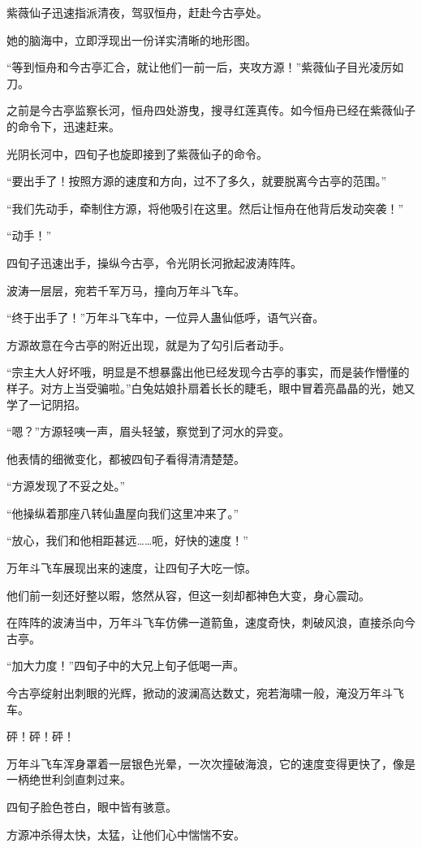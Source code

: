 \begin{this_body}
紫薇仙子迅速指派清夜，驾驭恒舟，赶赴今古亭处。

她的脑海中，立即浮现出一份详实清晰的地形图。

“等到恒舟和今古亭汇合，就让他们一前一后，夹攻方源！”紫薇仙子目光凌厉如刀。

之前是今古亭监察长河，恒舟四处游曳，搜寻红莲真传。如今恒舟已经在紫薇仙子的命令下，迅速赶来。

光阴长河中，四旬子也旋即接到了紫薇仙子的命令。

“要出手了！按照方源的速度和方向，过不了多久，就要脱离今古亭的范围。”

“我们先动手，牵制住方源，将他吸引在这里。然后让恒舟在他背后发动突袭！”

“动手！”

四旬子迅速出手，操纵今古亭，令光阴长河掀起波涛阵阵。

波涛一层层，宛若千军万马，撞向万年斗飞车。

“终于出手了！”万年斗飞车中，一位异人蛊仙低呼，语气兴奋。

方源故意在今古亭的附近出现，就是为了勾引后者动手。

“宗主大人好坏哦，明显是不想暴露出他已经发现今古亭的事实，而是装作懵懂的样子。对方上当受骗啦。”白兔姑娘扑扇着长长的睫毛，眼中冒着亮晶晶的光，她又学了一记阴招。

“嗯？”方源轻咦一声，眉头轻皱，察觉到了河水的异变。

他表情的细微变化，都被四旬子看得清清楚楚。

“方源发现了不妥之处。”

“他操纵着那座八转仙蛊屋向我们这里冲来了。”

“放心，我们和他相距甚远……呃，好快的速度！”

万年斗飞车展现出来的速度，让四旬子大吃一惊。

他们前一刻还好整以暇，悠然从容，但这一刻却都神色大变，身心震动。

在阵阵的波涛当中，万年斗飞车仿佛一道箭鱼，速度奇快，刺破风浪，直接杀向今古亭。

“加大力度！”四旬子中的大兄上旬子低喝一声。

今古亭绽射出刺眼的光辉，掀动的波澜高达数丈，宛若海啸一般，淹没万年斗飞车。

砰！砰！砰！

万年斗飞车浑身罩着一层银色光晕，一次次撞破海浪，它的速度变得更快了，像是一柄绝世利剑直刺过来。

四旬子脸色苍白，眼中皆有骇意。

方源冲杀得太快，太猛，让他们心中惴惴不安。


\end{this_body}
